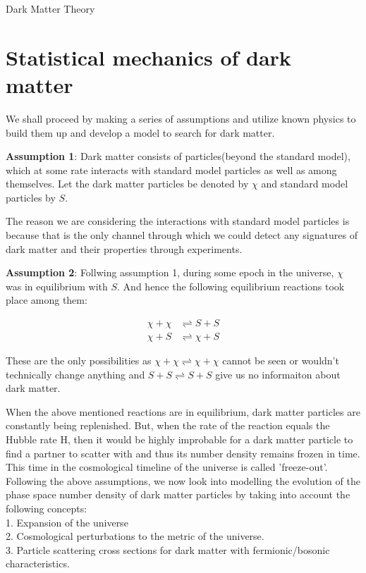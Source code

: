 \documentclass[10pt,a4paper]{book}
\begin{document}
	\begin{chapter}{Dark Matter Theory}
			\section{Statistical mechanics of dark matter}
		
		We shall proceed by making a series of assumptions and utilize known physics to build them up and develop a model to search for dark matter. 
		
		\textbf{Assumption 1}: Dark matter consists of particles(beyond the standard model), which at some rate interacts with standard model particles as well as among themselves. Let the dark matter particles be denoted by $\chi$ and standard model particles by $S$.
		
		The reason we are considering the interactions with standard model particles is because that is the only channel through which we could detect any signatures of dark matter and their properties through experiments. 
		
		\textbf{Assumption 2}: Follwing assumption 1, during some epoch in the universe, $\chi$ was in equilibrium with $S$. And hence the following equilibrium reactions took place among them: 
		
		
		\begin{align}
		\chi + \chi &\rightleftharpoons S + S \\
		\chi + S & \rightleftharpoons \chi + S    
		\end{align}
		
		These are the only possibilities as $\chi + \chi \rightleftharpoons \chi + \chi$ cannot be seen or wouldn't technically change anything and $S + S \rightleftharpoons S +S $ give us no informaiton about dark matter. 
		
		When the above mentioned reactions are in equilibrium, dark matter particles are constantly being replenished. But, when the rate of the reaction equals the Hubble rate H, then it would be highly improbable for a dark matter particle to find a partner to scatter with and thus its number density remains frozen in time. This time in the cosmological timeline of the universe is called 'freeze-out'. 
		\\
		
		Following the above assumptions, we now look into modelling the evolution of the phase space number density of dark matter particles by taking into account the following concepts:\\
		1. Expansion of the universe\\
		2. Cosmological perturbations to the metric of the universe.\\
		3. Particle scattering cross sections for dark matter with fermionic/bosonic characteristics.
		

\end{chapter}
\end{document}
